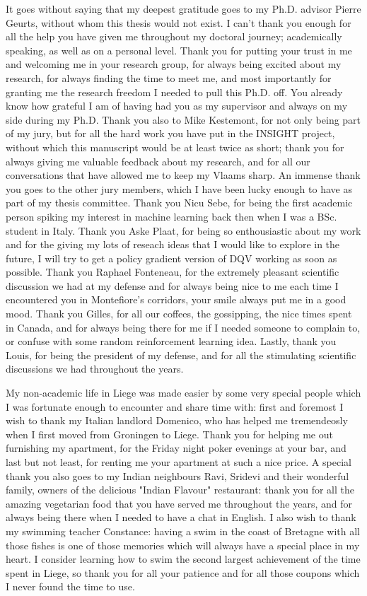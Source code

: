 It goes without saying that my deepest gratitude goes to my Ph.D. advisor Pierre Geurts, without whom this thesis would not exist. I can't thank you enough for all the help you have given me throughout my doctoral journey; academically speaking, as well as on a personal level. Thank you for putting your trust in me and welcoming me in your research group, for always being excited about my research, for always finding the time to meet me, and most importantly for granting me the research freedom I needed to pull this Ph.D. off. You already know how grateful I am of having had you as my supervisor and always on my side during my Ph.D. Thank you also to Mike Kestemont, for not only being part of my jury, but for all the hard work you have put in the INSIGHT project, without which this manuscript would be at least twice as short; thank you for always giving me valuable feedback about my research, and for all our conversations that have allowed me to keep my Vlaams sharp. An immense thank you goes to the other jury members, which I have been lucky enough to have as part of my thesis committee. Thank you Nicu Sebe, for being the first academic person spiking my interest in machine learning back then when I was a BSc. student in Italy. Thank you Aske Plaat, for being so enthousiastic about my work and for the giving my lots of reseach ideas that I would like to explore in the future, I will try to get a policy gradient version of DQV working as soon as possible. Thank you Raphael Fonteneau, for the extremely pleasant scientific discussion we had at my defense and for always being nice to me each time I encountered you in Montefiore's corridors, your smile always put me in a good mood. Thank you Gilles, for all our coffees, the gossipping, the nice times spent in Canada, and for always being there for me if I needed someone to complain to, or confuse with some random reinforcement learning idea. Lastly, thank you Louis, for being the president of my defense, and for all the stimulating scientific discussions we had throughout the years.     

My non-academic life in Liege was made easier by some very special people which I was fortunate enough to encounter and share time with: first and foremost I wish to thank my Italian landlord Domenico, who has helped me tremendeosly when I first moved from Groningen to Liege. Thank you for helping me out furnishing my apartment, for the Friday night poker evenings at your bar, and last but not least, for renting me your apartment at such a nice price. A special thank you also goes to my Indian neighbours Ravi, Sridevi and their wonderful family, owners of the delicious "Indian Flavour" restaurant: thank you for all the amazing vegetarian food that you have served me throughout the years, and for always being there when I needed to have a chat in English. I also wish to thank my swimming teacher Constance: having a swim in the coast of Bretagne with all those fishes is one of those memories which will always have a special place in my heart. I consider learning how to swim the second largest achievement of the time spent in Liege, so thank you for all your patience and for all those coupons which I never found the time to use.  

